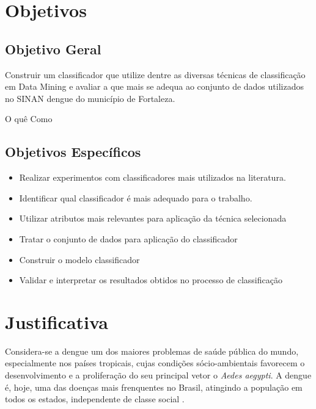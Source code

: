\documentclass[
	12pt,				%
	openright,			%
	oneside,	
	a4paper,				%
	english,				%
	brazil				%
]{abntex2/abntex2} %
\begin{document}
	\section{Objetivos}
	
		\subsection{Objetivo Geral}

		Construir um classificador que utilize dentre as diversas técnicas de classificação em Data Mining e avaliar a que mais se adequa ao conjunto de dados utilizados no SINAN dengue do município de Fortaleza.
		
		O quê
		Como
		
		\subsection{Objetivos Específicos}
		
		\begin{itemize}
			\item Realizar experimentos com classificadores mais utilizados na literatura.

			\item Identificar qual classificador é mais adequado para o trabalho.
			
			\item Utilizar atributos mais relevantes para aplicação da técnica selecionada
			
			\item Tratar o conjunto de dados para aplicação do classificador
			
			\item Construir o modelo classificador
			
			\item Validar e interpretar os resultados obtidos no processo de classificação
		\end{itemize}
		
	\section{Justificativa}
	
	Considera-se a dengue um dos maiores problemas de saúde pública do mundo, especialmente nos países tropicais, cujas condições sócio-ambientais favorecem o desenvolvimento e a proliferação do seu principal vetor o \textsl{Aedes aegypti}. A dengue é, hoje, uma das doenças mais frenquentes no Brasil, atingindo a população em todos os estados, independente de classe social \cite{saude:2008}.
	
\end{document}
